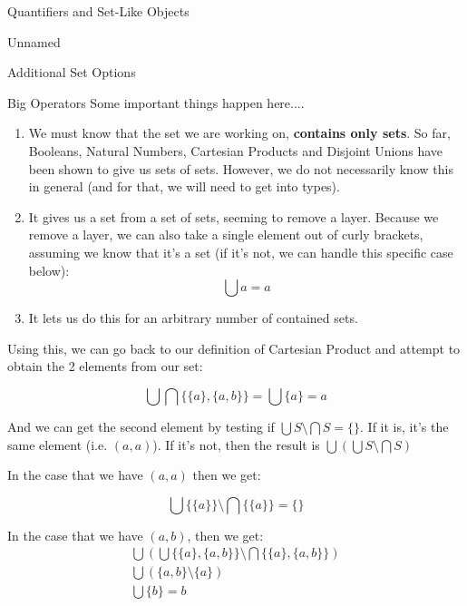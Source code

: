 \begin{part}{Quantifiers and Set-Like Objects}
\begin{chapter}{Unnamed}
\begin{section}{Additional Set Options}
\begin{subsection}{Big Operators}
                Some important things happen here....
                \begin{enumerate}
                    \item We must know that the set we are working on, \textbf{contains only sets}. So far, Booleans, Natural Numbers, Cartesian Products and Disjoint Unions have been shown to give us sets of sets. However, we do not necessarily know this in general (and for that, we will need to get into types).
                    
                    \item It gives us a set from a set of sets, seeming to remove a layer. Because we remove a layer, we can also take a single element out of curly brackets, assuming we know that it's a set (if it's not, we can handle this specific case below):
                    $$
                        \bigcup {a} = a
                    $$
                    
                    \item It lets us do this for an arbitrary number of contained sets.
                \end{enumerate}
                
                Using this, we can go back to our definition of Cartesian Product and attempt to obtain the 2 elements from our set:
                
                $$
                    \bigcup\bigcap \{ \{ a \}, \{ a, b \} \} = \bigcup \{ a \} = a
                $$
                
                And we can get the second element by testing if $\bigcup S \setminus \bigcap S = \{ \}$. If it is, it's the same element (i.e. $(a, a)$). If it's not, then the result is $\bigcup (\bigcup S \setminus \bigcap S)$
                
                In the case that we have $(a, a)$ then we get:
                
                $$
                    \bigcup \{ \{ a \} \} \setminus \bigcap \{ \{ a \} \} = \{ \}
                $$
                
                In the case that we have $(a, b)$, then we get:
                \begin{gather*}
                    \bigcup \left(\bigcup \{ \{ a \}, \{ a, b \} \} \setminus \bigcap \{ \{ a \}, \{ a, b \} \} \right) \\
                    \bigcup \left(\{a, b\} \setminus \{ a \}\right) \\
                    \bigcup \{ b \} = b
                \end{gather*}
                

\end{subsection}
\end{section}
\end{chapter}
\end{part}
